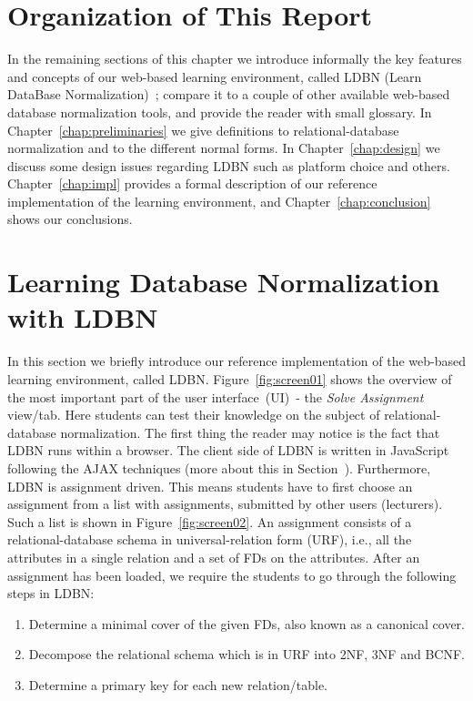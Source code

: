 \section{Organization of This Report}
\label{sec:organization}
In the remaining sections of this chapter we introduce informally 
the key features and concepts of our web-based learning environment, 
called LDBN (Learn DataBase Normalization)~\cite{wldbn}; 
compare it to a couple of other 
available web-based database normalization tools, and provide the reader with small glossary.  
In Chapter~\ref{chap:preliminaries} we give definitions to
relational-database normalization and to the different normal forms. 
In Chapter~\ref{chap:design} we discuss some design issues regarding LDBN such as 
platform choice and others. Chapter~\ref{chap:impl} provides a formal description
of our reference implementation of the learning environment, and
Chapter~\ref{chap:conclusion} shows our conclusions.

\section{Learning Database Normalization with LDBN}
\label{sec:introldbn}
In this section we briefly introduce our reference implementation
of the web-based learning environment, called LDBN.    
Figure~\ref{fig:screen01} shows the overview of the most important part of the 
user interface~(UI)~- 
the \textit{Solve Assignment} view/tab. Here students can test their knowledge on 
the subject of relational-database normalization. The first thing the reader 
may notice is the fact that LDBN runs within a browser. The client side 
of LDBN is written in JavaScript following the AJAX techniques 
(more about this in Section~\cite{sec:platform}). 
Furthermore, LDBN is assignment driven. This means students have to first 
choose an assignment 
from a list with assignments, submitted by other users (lecturers). 
Such a list is shown in Figure~\ref{fig:screen02}. 
An assignment consists of a relational-database schema in
universal-relation form (URF), i.e., all the attributes in a single relation 
and a set of FDs on the attributes. 
After an assignment has been loaded, we require the students to go through the 
following steps in LDBN:
\begin{enumerate}
	\item Determine a minimal cover of the given FDs, also known as a canonical cover.
	\item Decompose the relational schema which is in URF into 2NF, 3NF and BCNF. 
	\item Determine a primary key for each new relation/table. 
\end{enumerate}

